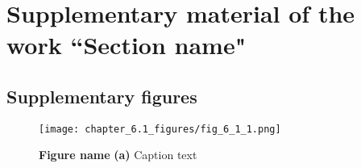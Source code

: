 
\renewcommand{\figurename}{\textbf{Supplementary Figure}}
\renewcommand{\tablename}{\textbf{Supplementary Table}}


\section{Supplementary material of the work “Section name"}
\subsection{Supplementary figures}
\newpage
\begin{figure}[h]
\centering
\texttt{[image: chapter\_6.1\_figures/fig\_6\_1\_1.png]}
\caption{\textbf{Figure name} \textbf{(a)} Caption text}
\label{suppfig:6.1-1}
\end{figure}
\
